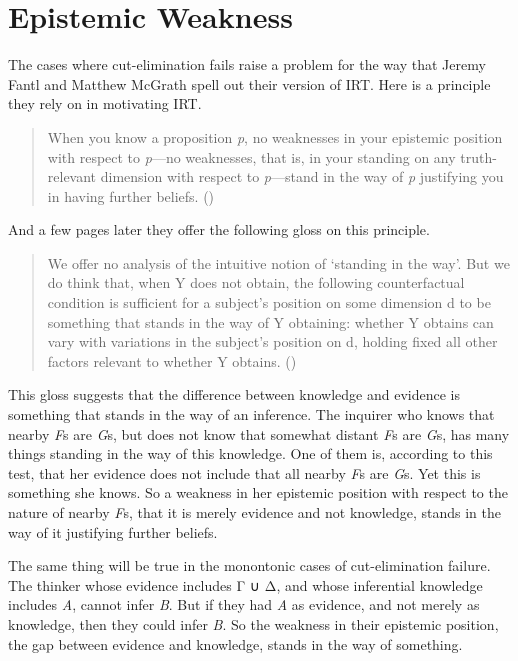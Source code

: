\documentclass[
  12pt,
  letterpaper,
]{scrbook}
\begin{document}
\section{Epistemic Weakness}\label{sec-weakness}

The cases where cut-elimination fails raise a problem for the way that
Jeremy Fantl and Matthew McGrath spell out their version of IRT. Here is
a principle they rely on in motivating IRT.

\begin{quote}
When you know a proposition \emph{p}, no weaknesses in your epistemic
position with respect to \emph{p}---no weaknesses, that is, in your
standing on any truth-relevant dimension with respect to
\emph{p}---stand in the way of \emph{p} justifying you in having further
beliefs. ()
\end{quote}

And a few pages later they offer the following gloss on this principle.

\begin{quote}
We offer no analysis of the intuitive notion of `standing in the way'.
But we do think that, when Y does not obtain, the following
counterfactual condition is sufficient for a subject's position on some
dimension d to be something that stands in the way of Y obtaining:
whether Y obtains can vary with variations in the subject's position on
d, holding fixed all other factors relevant to whether Y obtains.
()
\end{quote}

This gloss suggests that the difference between knowledge and evidence
is something that stands in the way of an inference. The inquirer who
knows that nearby \emph{F}s are \emph{G}s, but does not know that
somewhat distant \emph{F}s are \emph{G}s, has many things standing in
the way of this knowledge. One of them is, according to this test, that
her evidence does not include that all nearby \emph{F}s are \emph{G}s.
Yet this is something she knows. So a weakness in her epistemic position
with respect to the nature of nearby \emph{F}s, that it is merely
evidence and not knowledge, stands in the way of it justifying further
beliefs.

The same thing will be true in the monontonic cases of cut-elimination
failure. The thinker whose evidence includes Γ ∪ Δ, and whose
inferential knowledge includes \emph{A}, cannot infer \emph{B}. But if
they had \emph{A} as evidence, and not merely as knowledge, then they
could infer \emph{B}. So the weakness in their epistemic position, the
gap between evidence and knowledge, stands in the way of something.
\end{document}

